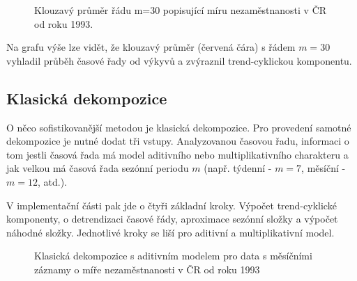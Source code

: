 \documentclass[FM,BP,fonts]{tulthesis}
\begin{document}
\begin{figure}[htbp]
	\centering
	\caption{Klouzavý průměr řádu m=30 popisující míru nezaměstnanosti v ČR od roku 1993. }
	\label{fig:my_graph}
\end{figure}

Na grafu výše lze vidět, že klouzavý průměr (červená čára) s řádem $m=30$ vyhladil průběh časové řady od výkyvů a zvýraznil trend-cyklickou komponentu.

\subsection{Klasická dekompozice}
O něco sofistikovanější metodou je klasická dekompozice. Pro provedení samotné dekompozice je nutné dodat tři vstupy. Analyzovanou časovou řadu, informaci o tom jestli časová řada má model aditivního nebo multiplikativního charakteru a jak velkou má časová řada sezónní periodu $m$ (např. týdenní - $m=7$, měsíční - $m=12$, atd.). 

V implementační části pak jde o čtyři základní kroky. Výpočet trend-cyklické komponenty, o detrendizaci časové řády, aproximace sezónní složky a výpočet náhodné složky. \cite{Hyndman2013-wm} Jednotlivé kroky se liší pro aditivní a multiplikativní model. 
 
\begin{figure}[htbp]
	\centering
	\caption{Klasická dekompozice s aditivním modelem pro data s měsíčními záznamy o míře nezaměstnanosti v ČR od roku 1993 }
	\label{fig:my_graph}
\end{figure}
\end{document}
